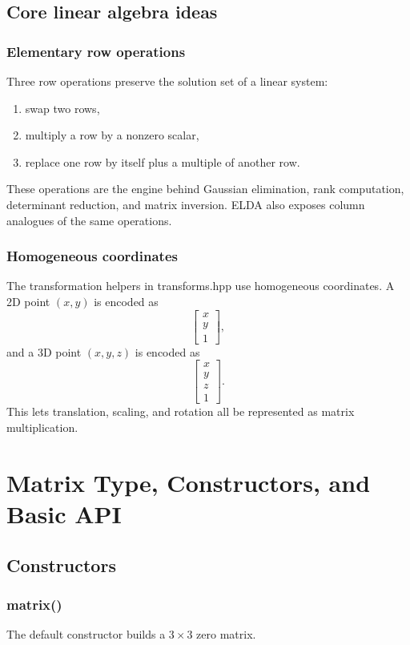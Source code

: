 \documentclass[11pt,a4paper,openany]{book}
\def\code#1{#1}%
\DeclareRobustCommand{\code}[1]{\texttt{\detokenize{#1}}}
\begin{document}
\section{Core linear algebra ideas}
\subsection{Elementary row operations}
Three row operations preserve the solution set of a linear system:
\begin{enumerate}[label=\arabic*.]
    \item swap two rows,
    \item multiply a row by a nonzero scalar,
    \item replace one row by itself plus a multiple of another row.
\end{enumerate}

These operations are the engine behind Gaussian elimination, rank computation, determinant reduction, and matrix inversion. ELDA also exposes column analogues of the same operations.

\subsection{Homogeneous coordinates}
The transformation helpers in \code{transforms.hpp} use homogeneous coordinates. A 2D point \((x, y)\) is encoded as
\[
\begin{bmatrix}
x \\ y \\ 1
\end{bmatrix},
\]
and a 3D point \((x, y, z)\) is encoded as
\[
\begin{bmatrix}
x \\ y \\ z \\ 1
\end{bmatrix}.
\]
This lets translation, scaling, and rotation all be represented as matrix multiplication.

\chapter{Matrix Type, Constructors, and Basic API}

\section{Constructors}

\subsection{\code{matrix()}}
The default constructor builds a \(3 \times 3\) zero matrix.
\end{document}
